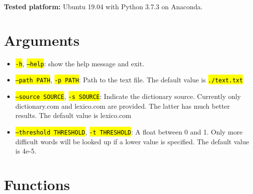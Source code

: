\documentclass[12pt]{article}
\newcommand{\hltexttt}[1]{\texttt{\hl{#1}}}
\begin{document}
\noindent \textbf{Tested platform:} Ubuntu 19.04 with Python 3.7.3 on Anaconda.

\section{Arguments}%
\label{sec:arguments}

\begin{itemize}
	
	\item \hltexttt{-h}, \hltexttt{--help}: show the help message and exit.
	\item \hltexttt{--path PATH}, \hltexttt{-p PATH}: Path to the text file. The default value is \hltexttt{./text.txt}
	\item \hltexttt{--source SOURCE}, \hltexttt{-s SOURCE}: Indicate the dictionary source. Currently only dictionary.com 
		and lexico.com are provided. The latter has much better results. The default value is lexico.com
	\item \hltexttt{--threshold THRESHOLD}, \hltexttt{-t THRESHOLD}: A float between 0 and 1. Only more difficult words 
		will be looked up if a lower value is specified. The default value is 4e-5. 
\end{itemize}

\section{Functions}%
\label{sec:functions}
\end{document}
